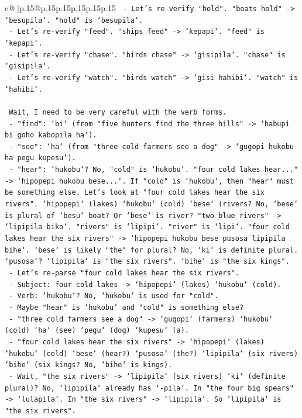 \documentclass{article}
\begin{document}
{\begin{supertabular}{c@{$\;$}|p{.15\linewidth}@{}p{.15\linewidth}p{.15\linewidth}p{.15\linewidth}p{.15\linewidth}p{.15\linewidth}}
{{{\texttt{  {-} Let's re{-}verify "hold". "boats hold" {-}> `besupila`. "hold" is `besupila`.} \\
\texttt{  {-} Let's re{-}verify "feed". "ships feed" {-}> `kepapi`. "feed" is `kepapi`.} \\
\texttt{  {-} Let's re{-}verify "chase". "birds chase" {-}> `gisipila`. "chase" is `gisipila`.} \\
\texttt{  {-} Let's re{-}verify "watch". "birds watch" {-}> `gisi hahibi`. "watch" is `hahibi`.} \\
\\ 
\texttt{  Wait, I need to be very careful with the verb forms.} \\
\texttt{  {-} "find": `bi` (from "five hunters find the three hills" {-}> `habupi bi goho kabopila ha`).} \\
\texttt{  {-} "see": `ha` (from "three cold farmers see a dog" {-}> `gugopi hukobu ha pegu kupesu`).} \\
\texttt{  {-} "hear": `hukobu`? No, "cold" is `hukobu`. "four cold lakes hear..." {-}> `hipopepi hukobu bese...`. If "cold" is `hukobu`, then "hear" must be something else. Let's look at "four cold lakes hear the six rivers". `hipopepi` (lakes) `hukobu` (cold) `bese` (rivers? No, `bese` is plural of `besu` boat? Or `bese` is river? "two blue rivers" {-}> `lipipila biko`. "rivers" is `lipipi`. "river" is `lipi`. "four cold lakes hear the six rivers" {-}> `hipopepi hukobu bese pusosa lipipila bihe`. `bese` is likely "the" for plural? No, `ki` is definite plural. `pusosa`? `lipipila` is "the six rivers". `bihe` is "the six kings".} \\
\texttt{  {-} Let's re{-}parse "four cold lakes hear the six rivers".} \\
\texttt{    {-} Subject: four cold lakes {-}> `hipopepi` (lakes) `hukobu` (cold).} \\
\texttt{    {-} Verb: `hukobu`? No, `hukobu` is used for "cold".} \\
\texttt{    {-} Maybe "hear" is `hukobu` and "cold" is something else?} \\
\texttt{    {-} "three cold farmers see a dog" {-}> `gugopi` (farmers) `hukobu` (cold) `ha` (see) `pegu` (dog) `kupesu` (a).} \\
\texttt{    {-} "four cold lakes hear the six rivers" {-}> `hipopepi` (lakes) `hukobu` (cold) `bese` (hear?) `pusosa` (the?) `lipipila` (six rivers) `bihe` (six kings? No, `bihe` is kings).} \\
\texttt{    {-} Wait, "the six rivers" {-}> `lipipila` (six rivers) `ki` (definite plural)? No, `lipipila` already has `{-}pila`. In "the four big spears" {-}> `lulapila`. In "the six rivers" {-}> `lipipila`. So `lipipila` is "the six rivers".} \\
}}}
\end{supertabular}}
\end{document}
